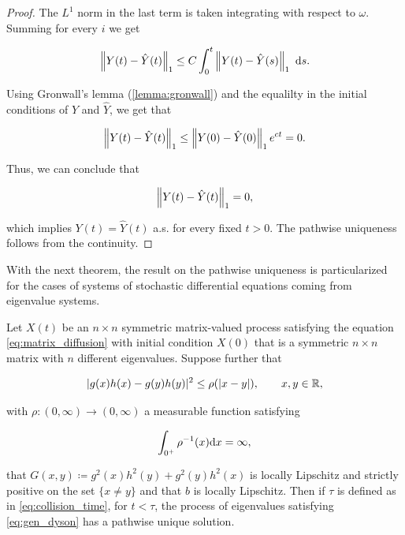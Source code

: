 \begin{proof}
    The $L^1$ norm in the last term is taken integrating with respect to $\omega$. Summing for every $i$ we get

    \begin{equation*}
        \left\lVert Y(t) - \hat Y(t)\right\rVert_1 \le  C \int_0^t \left\lVert Y(t) - \hat Y(s)\right\rVert_1~\mathrm d s.
    \end{equation*}

    Using Gronwall's lemma (\ref{lemma:gronwall}) and the equalilty in the initial conditions of $Y$ and $\hat Y$, we get that

    \begin{align*}
        \left\lVert Y(t) - \hat Y(t)\right\rVert_1 \le \left\lVert Y(0) - \hat Y(0)\right\rVert_1 e^{ct} = 0.
    \end{align*}

    Thus, we can conclude that 

    \begin{equation*}
        \left\lVert Y(t) - \hat Y(t)\right\rVert_1 = 0, 
    \end{equation*}

    \noindent which implies $Y(t) = \hat Y(t)$ a.s. for every fixed $t>0$. The pathwise uniqueness follows from the continuity.
\end{proof}

With the next theorem, the result on the pathwise uniqueness is particularized for the cases of systems of stochastic differential equations coming from eigenvalue systems.


\begin{theorem} \label{thm:spectral_yamadawatanabe}
    Let $X(t)$ be an $n\times n$ symmetric matrix-valued process satisfying the equation \eqref{eq:matrix_diffusion} with initial condition $X(0)$ that is a symmetric $n\times n$ matrix with $n$ different eigenvalues. Suppose further that

    \begin{equation}
        \lvert  g(x)h(x) - g(y)h(y)  \rvert^2 \le \rho(\lvert x-y \rvert), \qquad x,y \in \mathbb R,
    \end{equation}

    \noindent with $\rho:(0,\infty)\to(0,\infty)$ a measurable function satisfying

    \[ \int_{0^+} \rho^{-1}(x) \mathrm d x = \infty, \]

    \noindent that $G(x,y) \coloneqq g^2(x)h^2(y) + g^2(y)h^2(x)$ is locally Lipschitz and strictly positive on the set $\{ x \neq y\}$ and that $b$ is locally Lipschitz. Then if $\tau$ is defined as in \eqref{eq:collision_time}, for $t < \tau$, the process of eigenvalues satisfying \eqref{eq:gen_dyson} has a pathwise unique solution.
\end{theorem}

